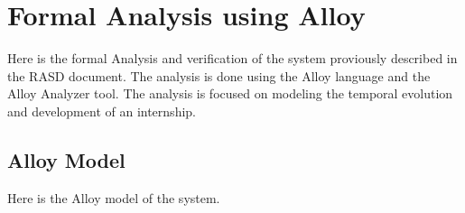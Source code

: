 \chapter{Formal Analysis using Alloy}%
\label{chap:Formal-Analysis-using-Alloy}%

\par Here is the formal Analysis and verification of the system proviously described in the RASD document. The analysis is done using the Alloy language and the Alloy Analyzer tool.
The analysis is focused on modeling the temporal evolution and development of an internship.

\section{Alloy Model}%
\label{sec:Alloy-Model}%


\par Here is the Alloy model of the system.

